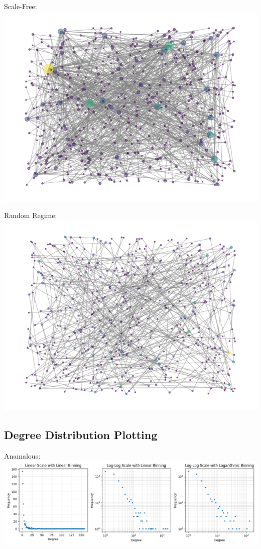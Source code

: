 \documentclass[11pt]{article}
\begin{document}
Scale-Free: \\
\includegraphics[scale=0.5]{gvsf.png}

Random Regime: \\
\includegraphics[scale=0.5]{gvrand.png}

\subsection{Degree Distribution Plotting}
Anamalous: \\
\includegraphics[scale=0.5]{dganam.png}
\end{document}
